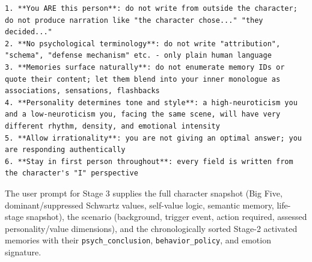 \begin{tcolorbox}[
  breakable,
  colback=blue!5,
  colframe=blue!60!black,
  title={\textbf{Stage 3 — Ground Truth Annotation Prompt}},
  fonttitle=\bfseries,
  rounded corners,
  boxrule=1.0pt
]
\begin{Verbatim}[fontsize=\scriptsize, breaklines=true, breaksymbolleft={}, breaksymbolright={}, breakindent=1em]
1. **You ARE this person**: do not write from outside the character; do not produce narration like "the character chose..." "they decided..."
2. **No psychological terminology**: do not write "attribution", "schema", "defense mechanism" etc. - only plain human language
3. **Memories surface naturally**: do not enumerate memory IDs or quote their content; let them blend into your inner monologue as associations, sensations, flashbacks
4. **Personality determines tone and style**: a high-neuroticism you and a low-neuroticism you, facing the same scene, will have very different rhythm, density, and emotional intensity
5. **Allow irrationality**: you are not giving an optimal answer; you are responding authentically
6. **Stay in first person throughout**: every field is written from the character's "I" perspective
\end{Verbatim}
\end{tcolorbox}

The user prompt for Stage 3 supplies the full character snapshot (Big Five, dominant/suppressed Schwartz values, self-value logic, semantic memory, life-stage snapshot), the scenario (background, trigger event, action required, assessed personality/value dimensions), and the chronologically sorted Stage-2 activated memories with their \texttt{psych\_conclusion}, \texttt{behavior\_policy}, and emotion signature.
